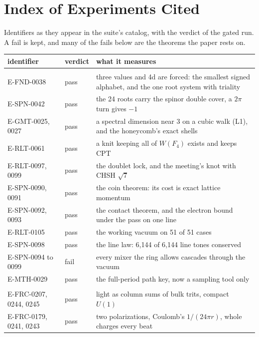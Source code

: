 \section{Index of Experiments Cited}
\label{sec:index}

Identifiers as they appear in the suite's catalog, with the verdict of the gated run. A fail is kept, and many of the
fails below are the theorems the paper rests on.

\begin{small}
\begin{longtable}{@{}>{\raggedright\arraybackslash}p{3.4cm}>{\raggedright\arraybackslash}p{2.2cm}p{9.3cm}@{}}
\toprule
identifier & verdict & what it measures \\
\midrule
\endhead
\multicolumn{3}{@{}l}{\emph{The base and the rule}} \\
E-FND-0038 & pass & three values and 4d are forced: the smallest signed alphabet, and the one root system with triality \\
E-SPN-0042 & pass & the 24 roots carry the spinor double cover, a $2\pi$ turn gives $-1$ \\
E-GMT-0025, 0027 & pass & a spectral dimension near 3 on a cubic walk (L1), and the honeycomb's exact shells \\
E-RLT-0061 & pass & a knit keeping all of $W(F_4)$ exists and keeps CPT \\
E-RLT-0097, 0099 & pass & the doublet lock, and the meeting's knot with CHSH $\sqrt7$ \\
E-SPN-0090, 0091 & pass & the coin theorem: its cost is exact lattice momentum \\
E-SPN-0092, 0093 & pass & the contact theorem, and the electron bound under the pass on one line \\
E-RLT-0105 & pass & the working vacuum on 51 of 51 cases \\
E-SPN-0098 & pass & the line law: 6,144 of 6,144 line tones conserved \\
E-SPN-0094 to 0099 & fail & every mixer the ring allows cascades through the vacuum \\
E-MTH-0029 & pass & the full-period path key, now a sampling tool only \\
\multicolumn{3}{@{}l}{\emph{Light and the quantum}} \\
E-FRC-0207, 0244, 0245 & pass & light as column sums of bulk trits, compact $U(1)$ \\
E-FRC-0179, 0241, 0243 & pass & two polarizations, Coulomb's $1/(24\pi r)$, whole charges every beat \\

\end{longtable}
\end{small}
